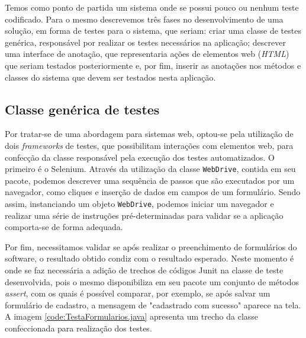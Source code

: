 \documentclass[tg]{mdtufsm}
\begin{document}
Temos como ponto de partida um sistema onde se possui pouco ou nenhum teste codificado. Para o mesmo descrevemos  três fases no desenvolvimento de uma solução, em forma de testes para o sistema,
que seriam: criar uma classe de testes genérica, responsável por realizar os testes necessários na aplicação; descrever uma interface de anotação, que representaria ações de elementos web (\emph{HTML}) que
seriam testados posteriormente e, por fim, inserir as anotações nos métodos e classes do sistema que devem ser testados nesta aplicação.

\subsection{Classe genérica de testes}
Por tratar-se de uma abordagem para sistemas web, optou-se pela utilização de dois \emph{frameworks} de testes, que possibilitam interações com elementos web, para confecção da classe responsável pela execução dos testes automatizados.
O primeiro é o Selenium. Através da utilização da classe \texttt{WebDrive}, contida em seu pacote, podemos descrever uma sequência de passos que são executados por um navegador, como cliques e inserção de dados em campos de um
formulário. Sendo assim, instanciando um objeto \texttt{WebDrive}, podemos iniciar um navegador e realizar uma série de instruções pré-determinadas para validar se a aplicação comporta-se de forma adequada.

Por fim, necessitamos validar se após realizar o preenchimento de formulários do software, o resultado obtido condiz com o resultado esperado. Neste momento é onde se faz necessária a adição de trechos de códigos Junit na classe de teste
desenvolvida, pois o mesmo disponibiliza em seu pacote um conjunto de métodos \emph{assert}, com os quais é possível comparar, por exemplo, se após salvar um formulário de cadastro, a mensagem de "cadastrado com sucesso" aparece na tela.
A imagem \ref{code:TestaFormularios.java} apresenta um trecho da classe confeccionada para realização dos testes.
\end{document}
